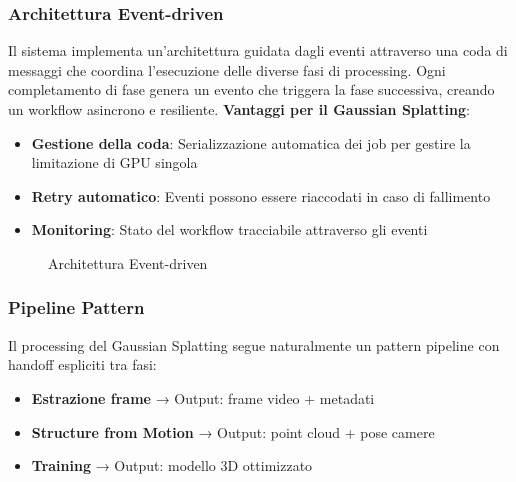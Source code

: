 \subsubsection{Architettura Event-driven}
Il sistema implementa un'architettura guidata dagli eventi attraverso una coda di messaggi che coordina l'esecuzione delle diverse fasi di processing. Ogni completamento di fase genera un evento che triggera la fase successiva, creando un workflow asincrono e resiliente.\newline\newline
\textbf{Vantaggi per il Gaussian Splatting}:
\begin{itemize}
	\item \textbf{Gestione della coda}: Serializzazione automatica dei job per gestire la limitazione di GPU singola
	\item \textbf{Retry automatico}: Eventi possono essere riaccodati in caso di fallimento
	\item \textbf{Monitoring}: Stato del workflow tracciabile attraverso gli eventi
\end{itemize}

\begin{figure}[htbp]
	\centering
	\caption{Architettura Event-driven}
	\label{fig:event_driven_architecture}
\end{figure}

\subsubsection{Pipeline Pattern}
Il processing del Gaussian Splatting segue naturalmente un pattern pipeline con handoff espliciti tra fasi:

\begin{itemize}
	\item \textbf{Estrazione frame} → Output: frame video + metadati
	\item \textbf{Structure from Motion} → Output: point cloud + pose camere
	\item \textbf{Training} → Output: modello 3D ottimizzato
\end{itemize}

